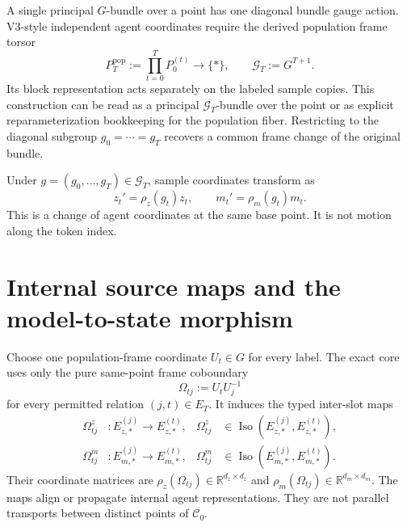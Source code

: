 A single principal \(G\)-bundle over a point has one diagonal bundle gauge action. V3-style independent agent coordinates require the derived population frame torsor
\begin{equation}
P_T^{\mathrm{pop}}
:=\prod_{t=0}^{T}P_0^{(t)}
\longrightarrow\{\ast\},
\qquad
\mathcal G_T:=G^{T+1}.
\label{eq:population-frame-torsor}
\end{equation}
Its block representation acts separately on the labeled sample copies. This construction can be read as a principal \(\mathcal G_T\)-bundle over the point or as explicit reparameterization bookkeeping for the population fiber. Restricting to the diagonal subgroup \(g_0=\cdots=g_T\) recovers a common frame change of the original bundle.

Under \(g=(g_0,\ldots,g_T)\in\mathcal G_T\), sample coordinates transform as
\begin{equation}
z_t'=\rho_z(g_t)z_t,
\qquad
m_t'=\rho_m(g_t)m_t.
\label{eq:state-model-gauge-law}
\end{equation}
This is a change of agent coordinates at the same base point. It is not motion along the token index.

\section{Internal source maps and the model-to-state morphism}

Choose one population-frame coordinate \(U_t\in G\) for every label. The exact core uses only the pure same-point frame coboundary
\begin{equation}
\Omega_{tj}:=U_tU_j^{-1}
\label{eq:regime-i-vertex-cocycle}
\end{equation}
for every permitted relation \((j,t)\in E_T\). It induces the typed inter-slot maps
\begin{equation}
\begin{aligned}
\Omega^z_{tj}&:E_{z,\ast}^{(j)}\longrightarrow E_{z,\ast}^{(t)},
&\Omega^z_{tj}&\in\operatorname{Iso}(E_{z,\ast}^{(j)},E_{z,\ast}^{(t)}),\\
\Omega^m_{tj}&:E_{m,\ast}^{(j)}\longrightarrow E_{m,\ast}^{(t)},
&\Omega^m_{tj}&\in\operatorname{Iso}(E_{m,\ast}^{(j)},E_{m,\ast}^{(t)}).
\end{aligned}
\label{eq:typed-associated-transports}
\end{equation}
Their coordinate matrices are \(\rho_z(\Omega_{tj})\in\mathbb R^{d_z\times d_z}\) and \(\rho_m(\Omega_{tj})\in\mathbb R^{d_m\times d_m}\). The maps align or propagate internal agent representations. They are not parallel transports between distinct points of \(\mathcal C_0\).

